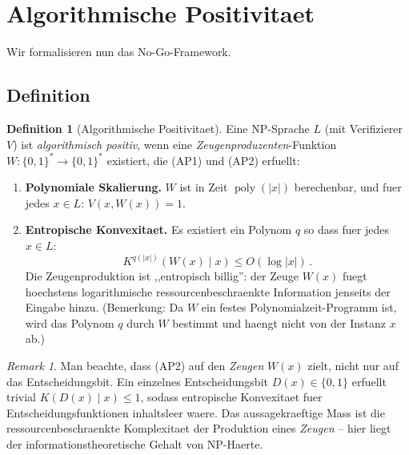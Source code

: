 \documentclass[aps,prd,twocolumn,superscriptaddress,nofootinbib]{revtex4-2}
\theoremstyle{definition}
\newtheorem{definition}[theorem]{Definition}
\theoremstyle{remark}
\newtheorem{remark}[theorem]{Remark}
\DeclareMathOperator{\poly}{poly}
\begin{document}
\section{Algorithmische Positivitaet}
\label{sec:positivity}

Wir formalisieren nun das No-Go-Framework.

\subsection{Definition}

\begin{definition}[Algorithmische Positivitaet]
\label{def:alg_pos}
Eine NP-Sprache $L$ (mit Verifizierer $V$) ist \textit{algorithmisch positiv}, wenn eine \textit{Zeugenproduzenten}-Funktion $W: \{0,1\}^* \to \{0,1\}^*$ existiert, die (AP1) und (AP2) erfuellt:

\begin{enumerate}
\item[\textbf{(AP1)}] \textbf{Polynomiale Skalierung.} $W$ ist in Zeit $\poly(|x|)$ berechenbar, und fuer jedes $x \in L$: $V(x, W(x)) = 1$.

\item[\textbf{(AP2)}] \textbf{Entropische Konvexitaet.} Es existiert ein Polynom $q$ so dass fuer jedes $x \in L$:
\begin{equation}
K^{q(|x|)}(W(x) \mid x) \leq O(\log|x|)\,.
\end{equation}
Die Zeugenproduktion ist ,,entropisch billig'': der Zeuge $W(x)$ fuegt hoechstens logarithmische ressourcenbeschraenkte Information jenseits der Eingabe hinzu. (Bemerkung: Da $W$ ein festes Polynomialzeit-Programm ist, wird das Polynom $q$ durch $W$ bestimmt und haengt nicht von der Instanz $x$ ab.)
\end{enumerate}
\end{definition}

\begin{remark}
Man beachte, dass (AP2) auf den \textit{Zeugen} $W(x)$ zielt, nicht nur auf das Entscheidungsbit. Ein einzelnes Entscheidungsbit $D(x) \in \{0,1\}$ erfuellt trivial $K(D(x) \mid x) \leq 1$, sodass entropische Konvexitaet fuer Entscheidungsfunktionen inhaltsleer waere. Das aussagekraeftige Mass ist die ressourcenbeschraenkte Komplexitaet der Produktion eines \textit{Zeugen} -- hier liegt der informationstheoretische Gehalt von NP-Haerte.
\end{remark}
\end{document}
